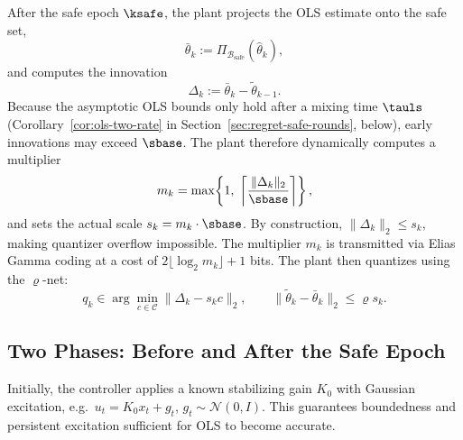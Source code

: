 \documentclass[11pt,journal,onecolumn]{IEEEtran}
\begin{document}
After the safe epoch $\ksafe$, the plant projects the OLS estimate onto the safe set,
\begin{equation}\label{eq:plant-proj}
    \bar\theta_k := \Pi_{\mathcal{B}_{\mathrm{safe}}}(\hat\theta_k),
\end{equation}
and computes the innovation
\begin{equation}\label{eq:innovation}
    \Delta_k := \bar\theta_k - \tilde\theta_{k-1}.
\end{equation}
Because the asymptotic OLS bounds only hold after a mixing time $\tauls$ (Corollary~\ref{cor:ols-two-rate} in Section~\ref{sec:regret-safe-rounds}, below), early innovations may exceed $\sbase$. The plant therefore dynamically computes a multiplier
\begin{equation}
    \label{eq:adaptive-mult}
    m_k = \max\!\left\{1,\; \left\lceil \frac{\|\Delta_k\|_2}{\sbase} \right\rceil\right\},
\end{equation}
and sets the actual scale $s_k = m_k \cdot \sbase$. By construction, $\|\Delta_k\|_2 \le s_k$, making quantizer overflow impossible. The multiplier $m_k$ is transmitted via Elias Gamma coding at a cost of $2\lfloor\log_2 m_k\rfloor + 1$ bits. The plant then quantizes using the $\varrho$-net:
\begin{equation}\label{eq:quant-rule}
    q_k \in \arg\min_{c\in\mathcal C}\|\Delta_k - s_k c\|_2, \qquad \|\tilde\theta_k - \bar\theta_k\|_2 \le \varrho s_k.
\end{equation}

\subsection{Two Phases: Before and After the Safe Epoch}

Initially, the controller applies a known stabilizing gain \(K_0\) with Gaussian excitation,
e.g.\ \(u_t = K_0 x_t + g_t\), \(g_t\sim\mathcal N(0,I)\).
This guarantees boundedness and persistent excitation sufficient for OLS to become accurate.
\end{document}
